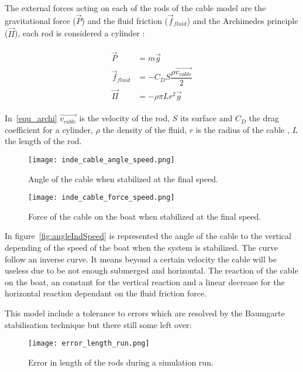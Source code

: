 The external forces acting on each of the rods of the cable model are the gravitational force ($\vec{P}$) and the fluid friction ($\vec{f}_{fluid}$) and the Archimedes principle ($\vec{\Pi}$), each rod is considered a cylinder :

\begin{align}
\begin{split}
\vec{P} &= m \vec{g}  \\
\vec{f}_{fluid} &= -C_D S \dfrac{\rho \vec{v_{cable}}}{2} \\
\vec{\Pi} &= - \rho \pi L r^2 \vec{g} \label{equ_archi}
\end{split}
\end{align}


In~\ref{equ_archi} $\vec{v_{cable}}$ is the velocity of the rod, $S$  its surface and $C_D$ the drag coefficient for a cylinder, $\rho$ the density of the fluid, $r$ is the radius of the cable , $L$ the length of the rod.
\begin{figure}[H]
\centering
    \begin{minipage}[b]{0.4\textwidth}
    \centering
    \texttt{[image: inde\_cable\_angle\_speed.png]}
    \caption{Angle of the cable when stabilized at the final speed.}
    \label{fig:angleIndSpeed}
    \end{minipage}
    \hfill
    \begin{minipage}[b]{0.45\textwidth}
    \centering
    \texttt{[image: inde\_cable\_force\_speed.png]}
    \caption{Force of the cable on the boat when stabilized at the final speed.}
    \label{fig:forceIndSpeed}
    \end{minipage}
\end{figure}


In figure~\ref{fig:angleIndSpeed} is represented the angle of the cable to the vertical depending of the speed of the boat when the system is stabilized. The curve follow an inverse curve.
It means beyond a certain velocity the cable will be useless due to be not enough submerged and horizontal.
The reaction of the cable on the boat, an constant for the vertical reaction and a linear decrease for the horizontal reaction dependant on the fluid friction force.

This model include a tolerance to errors which are resolved by the Baumgarte stabilisation technique but 
there still some left over:


\begin{figure}[H]
\centering
    \texttt{[image: error\_length\_run.png]}
    \caption{Error in length of the rods during a simulation run.}
    \label{fig:errorLRod}
\end{figure}

